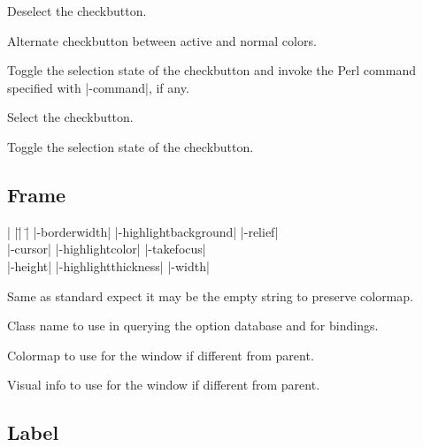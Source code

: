 \vskip5pt
\begin{enum}{1cm}

 Deselect the checkbutton. 

 Alternate checkbutton between 
active and normal colors.

 Toggle the selection state 
of the checkbutton and invoke the Perl command specified with |-command|, if any.

 Select the checkbutton.

 Toggle the selection state 
of the checkbutton.

\end{enum}

\subsection*{Frame}
\vspace{-4pt}

\begin{tabbing}
|                   |\=|                     |\= \kill
|-borderwidth|      \> |-highlightbackground| \> |-relief| \\
|-cursor|           \> |-highlightcolor|      \> |-takefocus| \\
|-height|	    \> |-highlightthickness|  \> |-width| \\
\end{tabbing}

\vskip5pt
\begin{enum}{1cm}

Same as standard expect it may be the empty string to preserve colormap.

Class name to use in querying the option database and for bindings.

Colormap to use for the window if different from parent.

Visual info to use for the window if different from parent.

\end{enum}

\subsection*{Label}
\vspace{-4pt}

